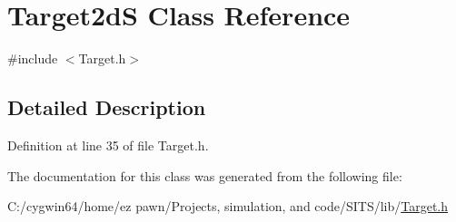 \hypertarget{class_target2d_s}{}\section{Target2dS Class Reference}
\label{class_target2d_s}


{\ttfamily \#include $<$Target.\+h$>$}



\subsection{Detailed Description}


Definition at line 35 of file Target.\+h.



The documentation for this class was generated from the following file\+:\begin{DoxyCompactItemize}
\item 
C\+:/cygwin64/home/ez pawn/\+Projects, simulation, and code/\+S\+I\+T\+S/lib/\hyperlink{_target_8h}{Target.\+h}\end{DoxyCompactItemize}
